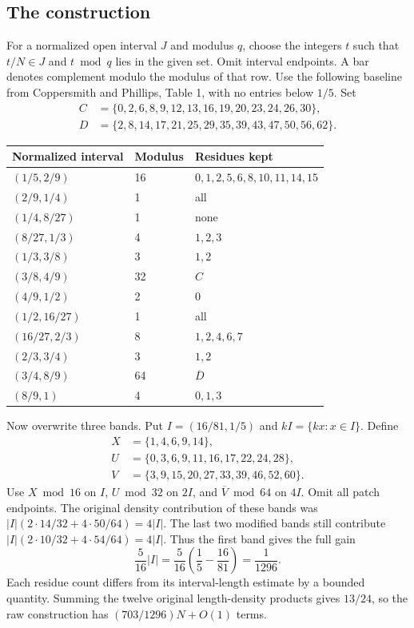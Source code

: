 \documentclass[11pt]{article}
\begin{document}
\subsection{The construction}
For a normalized open interval $J$ and modulus $q$, choose the integers $t$ such that $t/N\in J$ and $t\bmod q$ lies in the given set. Omit interval endpoints. A bar denotes complement modulo the modulus of that row. Use the following baseline from Coppersmith and Phillips, Table 1, with no entries below $1/5$. Set
\[
\begin{aligned}
C&=\{0,2,6,8,9,12,13,16,19,20,23,24,26,30\},\\
D&=\{2,8,14,17,21,25,29,35,39,43,47,50,56,62\}.
\end{aligned}
\]
\begin{center}\small
\begin{tabular}{lll}
Normalized interval & Modulus & Residues kept \\ \hline
$(1/5,2/9)$&16&$0,1,2,5,6,8,10,11,14,15$\\
$(2/9,1/4)$&1&all\\
$(1/4,8/27)$&1&none\\
$(8/27,1/3)$&4&$1,2,3$\\
$(1/3,3/8)$&3&$1,2$\\
$(3/8,4/9)$&32&$C$\\
$(4/9,1/2)$&2&$0$\\
$(1/2,16/27)$&1&all\\
$(16/27,2/3)$&8&$1,2,4,6,7$\\
$(2/3,3/4)$&3&$1,2$\\
$(3/4,8/9)$&64&$\overline D$\\
$(8/9,1)$&4&$0,1,3$\\
\end{tabular}\end{center}
Now overwrite three bands. Put $I=(16/81,1/5)$ and $kI=\{kx:x\in I\}$. Define
\[
\begin{aligned}
X&=\{1,4,6,9,14\},\\
U&=\{0,3,6,9,11,16,17,22,24,28\},\\
V&=\{3,9,15,20,27,33,39,46,52,60\}.
\end{aligned}
\]
Use $X\bmod16$ on $I$, $U\bmod32$ on $2I$, and $\overline V\bmod64$ on $4I$. Omit all patch endpoints. The original density contribution of these bands was $|I|(2\cdot14/32+4\cdot50/64)=4|I|$. The last two modified bands still contribute $|I|(2\cdot10/32+4\cdot54/64)=4|I|$. Thus the first band gives the full gain
\[
\frac{5}{16}|I|=\frac{5}{16}\left(\frac15-\frac{16}{81}\right)=\frac1{1296}.
\]
Each residue count differs from its interval-length estimate by a bounded quantity. Summing the twelve original length-density products gives $13/24$, so the raw construction has $(703/1296)N+O(1)$ terms.
\end{document}
